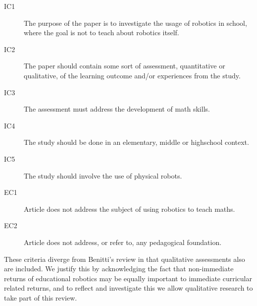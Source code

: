 \begin{description}
	\item[IC1] The purpose of the paper is to investigate the usage of robotics in school, where the goal is not to teach about robotics itself.
	\item[IC2] The paper should contain some sort of assessment, quantitative or qualitative, of the learning outcome and/or experiences from the study. 
	\item[IC3] The assessment must address the development of math skills. 
	\item[IC4] The study should be done in an elementary, middle or highschool context.
	\item[IC5] The study should involve the use of physical robots.
	\item[EC1] Article does not address the subject of using robotics to teach maths. 
	\item[EC2] Article does not address, or refer to, any pedagogical foundation. 
\end{description}
These criteria diverge from Benitti's review in that qualitative assessments also are included. 
We justify this by acknowledging the fact that non-immediate returns of educational robotics may be equally important to immediate curricular related returns,
and to reflect and investigate this we allow qualitative research to take part of this review. 	




